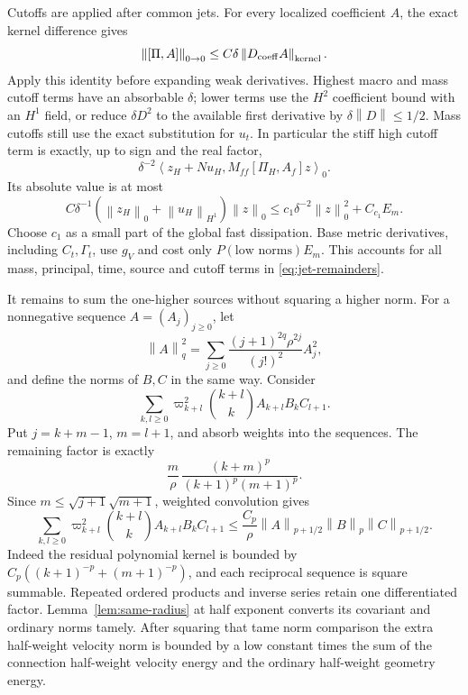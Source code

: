 \documentclass[11pt,a4paper]{article}
\numberwithin{equation}{section}
\theoremstyle{remark}
\newcommand{\norm}[1]{\left\lVert #1\right\rVert}
\newcommand{\ip}[2]{\left\langle #1,#2\right\rangle_0}
\begin{document}
Cutoffs are applied after common jets. For every localized
coefficient \(A\), the exact kernel difference gives
\[
 \norm{[\Pi,A]}_{0\to0}
       \leq C\delta\norm{D_{\rm coeff}A}_{\rm kernel}.
\]
Apply this identity before expanding weak derivatives. Highest
macro and mass cutoff terms have an absorbable \(\delta\);
lower terms use the \(H^2\) coefficient bound with an \(H^1\)
field, or reduce \(\delta D^2\) to the available first derivative
by \(\delta\norm D\leq1/2\). Mass cutoffs still use the exact
substitution for \(u_t\). In particular the stiff high cutoff
term is exactly, up to sign and the real factor,
\[
 \delta^{-2}\ip{z_H+Nu_H}{M_{ff}[\Pi_H,A_f]z}.
\]
Its absolute value is at most
\[
 C\delta^{-1}(\norm{z_H}_0+\norm{u_H}_{H^1})\norm z_0
 \leq c_1\delta^{-2}\norm z_0^2+C_{c_1}E_m .
\]
Choose \(c_1\) as a small part of the global fast dissipation.
Base metric derivatives, including \(C_t,\Gamma_t\), use \(g_V\)
and cost only \(P(\text{low norms})E_m\).
This accounts for all mass, principal, time, source and cutoff
terms in \eqref{eq:jet-remainders}.

It remains to sum the one-higher sources without squaring a higher
norm. For a nonnegative sequence \(A=(A_j)_{j\geq0}\), let
\[
 \norm A_q^2=\sum_{j\geq0}
       \frac{(j+1)^{2q}\rho^{2j}}{(j!)^2}A_j^2 ,
\]
and define the norms of \(B,C\) in the same way. Consider
\[
 \sum_{k,l\geq0}\varpi_{k+l}^2\binom{k+l}{k}
                  A_{k+l}B_k C_{l+1}.
\]
Put \(j=k+m-1\), \(m=l+1\), and absorb weights into the sequences.
The remaining factor is exactly
\[
 \frac m\rho\,\frac{(k+m)^p}{(k+1)^p(m+1)^p}.
\]
Since \(m\leq\sqrt{j+1}\sqrt{m+1}\), weighted convolution gives
\begin{equation}\label{eq:half-pair}
 \sum_{k,l\geq0}\varpi_{k+l}^2\binom{k+l}{k}A_{k+l}B_kC_{l+1}
 \leq \frac{C_p}{\rho}
  \norm A_{p+1/2}\norm B_p\norm C_{p+1/2}.
\end{equation}
Indeed the residual polynomial kernel is bounded by
\(C_p((k+1)^{-p}+(m+1)^{-p})\), and each reciprocal sequence is
square summable. Repeated ordered products and inverse series
retain one differentiated factor. Lemma~\ref{lem:same-radius}
at half exponent converts its covariant and ordinary norms tamely.
After squaring that tame norm comparison the extra half-weight
velocity norm is bounded by a low constant times the sum of the
connection half-weight velocity energy and the ordinary half-weight
geometry energy.
\end{document}
